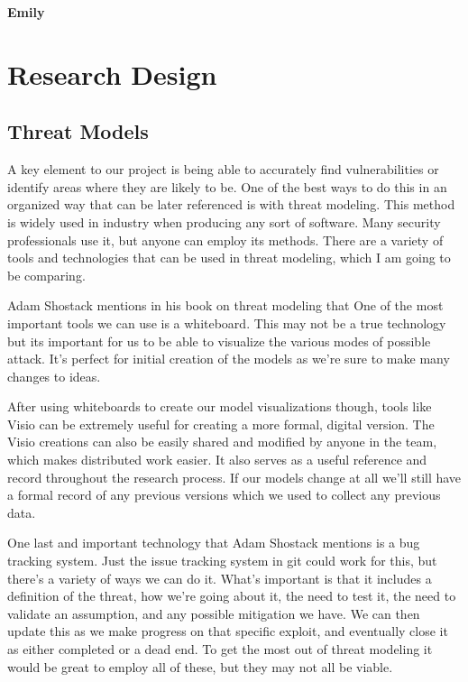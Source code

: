 \documentclass[IEEEtran,letterpaper,10pt,notitlepage,draftclsnofoot,onecolumn]{article}
\begin{document}
\textbf{Emily}

\section{Research Design}
\subsection{Threat Models}
A key element to our project is being able to accurately find vulnerabilities or identify areas where they are likely to be.
One of the best ways to do this in an organized way that can be later referenced is with threat modeling.
This method is widely used in industry when producing any sort of software. Many security professionals use it, but anyone can employ its methods.
There are a variety of tools and technologies that can be used in threat modeling, which I am going to be comparing.

Adam Shostack mentions in his book on threat modeling that  \cite[p.203]{TMDS}
One of the most important tools we can use is a whiteboard.
This may not be a true technology but its important for us to be able to visualize the various modes of possible attack.
It's perfect for initial creation of the models as we're sure to make many changes to ideas.

After using whiteboards to create our model visualizations though, tools like Visio can be extremely useful for creating a more formal, digital version.
The Visio creations can also be easily shared and modified by anyone in the team, which makes distributed work easier.
It also serves as a useful reference and record throughout the research process.
If our models change at all we'll still have a formal record of any previous versions which we used to collect any previous data.

One last and important technology that Adam Shostack mentions is a bug tracking system.
Just the issue tracking system in git could work for this, but there's a variety of ways we can do it.
What's important is that it includes a definition of the threat, how we're going about it, the need to test it, the need to validate an assumption, and any possible mitigation we have. \cite[p.205]{TMDS}
We can then update this as we make progress on that specific exploit, and eventually close it as either completed or a dead end.
To get the most out of threat modeling it would be great to employ all of these, but they may not all be viable.
\end{document}

